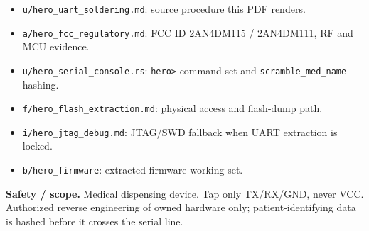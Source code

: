 \documentclass[10pt]{article}
\begin{document}
\begin{itemize}
\item \texttt{u/hero\_uart\_soldering.md}: source procedure this PDF renders.
\item \texttt{a/hero\_fcc\_regulatory.md}: FCC ID 2AN4DM115 / 2AN4DM111, RF and MCU evidence.
\item \texttt{u/hero\_serial\_console.rs}: \texttt{hero>} command set and \texttt{scramble\_med\_name} hashing.
\item \texttt{f/hero\_flash\_extraction.md}: physical access and flash-dump path.
\item \texttt{i/hero\_jtag\_debug.md}: JTAG/SWD fallback when UART extraction is locked.
\item \texttt{b/hero\_firmware}: extracted firmware working set.
\end{itemize}

\textbf{Safety / scope.} Medical dispensing device. Tap only TX/RX/GND, never VCC. Authorized reverse engineering of owned hardware only; patient-identifying data is hashed before it crosses the serial line.
\end{document}
